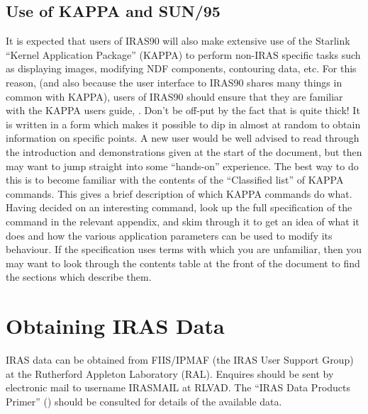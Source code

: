 \documentclass[11pt,nolof,noabs]{starlink}
\begin{document}
\subsection{Use of KAPPA and SUN/95}
It is expected that users of {\small IRAS90} will also make extensive use of the
Starlink ``Kernel Application Package'' ({\small KAPPA}) to perform non-IRAS
specific tasks such as displaying images, modifying {\small NDF} components,
contouring data, etc. For this reason, (and also because the user interface to
{\small IRAS90} shares many things in common with {\small KAPPA}), users of
{\small IRAS90} should ensure that they are familiar with  the {\small KAPPA}
users guide, . Don't be off-put by the fact that  is quite thick! It
is written in a form which makes it possible to dip in almost at random to
obtain information on specific points. A new user would be well advised to read
through the introduction and demonstrations given at the start of the document,
but then may want to jump straight into some ``hands-on'' experience. The best
way to do this is to become familiar with the contents of the ``Classified
list''  of {\small KAPPA} commands. This gives a brief description of which
{\small KAPPA} commands do  what. Having decided on an interesting command, look
up the full specification of the command in the relevant appendix, and skim
through it to get an idea of what it does and how the various application
parameters can be used to modify its behaviour. If the specification uses terms
with which you are unfamiliar, then you may want to look through the contents
table at the front of the document to find the sections which describe them.

\section{Obtaining IRAS Data}
{\small IRAS} data can be obtained from {\small FIIS/IPMAF} (the {\small IRAS}
User Support Group) at the Rutherford Appleton Laboratory ({\small RAL}).
Enquires should be sent by electronic mail to username {\small IRASMAIL} at
{\small RLVAD}. The ``{\small IRAS} Data Products Primer'' () should be
consulted for details of the available data.
\end{document}
